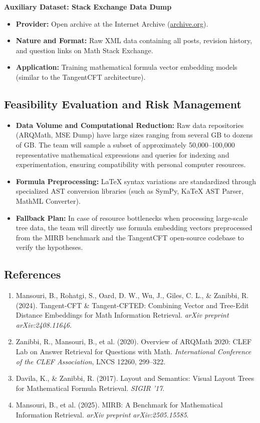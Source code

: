\documentclass[11pt,a4paper]{article}
\begin{document}
\vspace{0.8em}
\noindent\textbf{Auxiliary Dataset: Stack Exchange Data Dump}
\begin{itemize}[leftmargin=1.5em]
    \item \textbf{Provider:} Open archive at the Internet Archive (\url{archive.org}).
    \item \textbf{Nature and Format:} Raw XML data containing all posts, revision history, and question links on Math Stack Exchange.
    \item \textbf{Application:} Training mathematical formula vector embedding models (similar to the TangentCFT architecture).
\end{itemize}

\subsection{Feasibility Evaluation and Risk Management}
\begin{itemize}[leftmargin=1.5em]
    \item \textbf{Data Volume and Computational Reduction:} Raw data repositories (ARQMath, MSE Dump) have large sizes ranging from several GB to dozens of GB. The team will sample a subset of approximately 50,000--100,000 representative mathematical expressions and queries for indexing and experimentation, ensuring compatibility with personal computer resources.
    \item \textbf{Formula Preprocessing:} \LaTeX{} syntax variations are standardized through specialized AST conversion libraries (such as SymPy, KaTeX AST Parser, MathML Converter).
    \item \textbf{Fallback Plan:} In case of resource bottlenecks when processing large-scale tree data, the team will directly use formula embedding vectors preprocessed from the MIRB benchmark and the TangentCFT open-source codebase to verify the hypotheses.
\end{itemize}

\subsection{References}
\begin{enumerate}[leftmargin=1.5em]
    \item Mansouri, B., Rohatgi, S., Oard, D. W., Wu, J., Giles, C. L., \& Zanibbi, R. (2024). Tangent-CFT \& Tangent-CFTED: Combining Vector and Tree-Edit Distance Embeddings for Math Information Retrieval. \textit{arXiv preprint arXiv:2408.11646}.
    \item Zanibbi, R., Mansouri, B., et al. (2020). Overview of ARQMath 2020: CLEF Lab on Answer Retrieval for Questions with Math. \textit{International Conference of the CLEF Association}, LNCS 12260, 299--322.
    \item Davila, K., \& Zanibbi, R. (2017). Layout and Semantics: Visual Layout Trees for Mathematical Formula Retrieval. \textit{SIGIR '17}.
    \item Mansouri, B., et al. (2025). MIRB: A Benchmark for Mathematical Information Retrieval. \textit{arXiv preprint arXiv:2505.15585}.
\end{enumerate}
\end{document}
